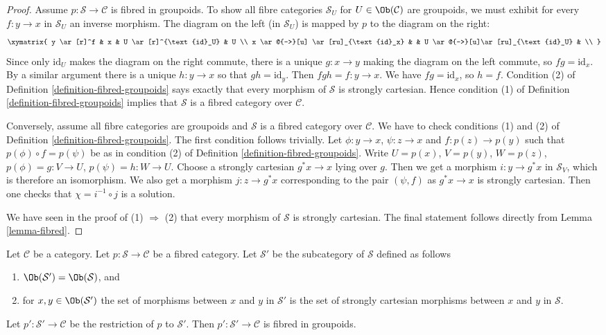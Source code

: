 \begin{proof}
Assume $p : \mathcal{S} \to \mathcal{C}$ is fibred in groupoids.
To show all fibre categories $\mathcal{S}_U$ for
$U \in \Ob(\mathcal{C})$
are groupoids, we must exhibit for every $f : y \to x$ in $\mathcal{S}_U$ an
inverse morphism. The diagram on the left (in $\mathcal{S}_U$) is mapped by
$p$ to the diagram on the right:
$$
\xymatrix{
y \ar[r]^f & x & U \ar[r]^{\text{id}_U} & U \\
x \ar@{-->}[u] \ar[ru]_{\text{id}_x} & &
U \ar@{-->}[u]\ar[ru]_{\text{id}_U} & \\
}
$$
Since only $\text{id}_U$ makes the diagram on the right commute, there is a
unique $g : x \to y$ making the diagram on the left commute, so
$fg = \text{id}_x$. By a similar argument there is a unique $h : y \to x$ so
that $gh = \text{id}_y$. Then $fgh = f : y \to x$. We have $fg = \text{id}_x$,
so $h = f$. Condition (2) of Definition \ref{definition-fibred-groupoids} says
exactly that every morphism of $\mathcal{S}$ is strongly cartesian. Hence
condition (1) of Definition \ref{definition-fibred-groupoids} implies that
$\mathcal{S}$ is a fibred category over $\mathcal{C}$.

\medskip\noindent
Conversely, assume all fibre categories are groupoids and
$\mathcal{S}$ is a fibred category over $\mathcal{C}$.
We have to check conditions (1) and (2) of
Definition \ref{definition-fibred-groupoids}.
The first condition follows trivially. Let $\phi : y \to x$,
$\psi : z \to x$ and $f : p(z) \to p(y)$ such that
$p(\phi) \circ f = p(\psi)$ be as in condition (2) of
Definition \ref{definition-fibred-groupoids}.
Write $U = p(x)$, $V = p(y)$, $W = p(z)$, $p(\phi) = g : V \to U$,
$p(\psi) = h : W \to U$. Choose a strongly cartesian $g^*x \to x$
lying over $g$. Then we get a morphism $i : y \to g^*x$ in
$\mathcal{S}_V$, which is therefore an isomorphism. We
also get a morphism $j : z \to g^*x$ corresponding to
the pair $(\psi, f)$ as $g^*x \to x$ is strongly cartesian.
Then one checks that $\chi = i^{-1} \circ j$ is a solution.

\medskip\noindent
We have seen in the proof of (1) $\Rightarrow$ (2) that
every morphism of $\mathcal{S}$ is strongly cartesian.
The final statement follows directly from Lemma \ref{lemma-fibred}.
\end{proof}

\begin{lemma}
\label{lemma-fibred-gives-fibred-groupoids}
Let $\mathcal{C}$ be a category.
Let $p : \mathcal{S} \to \mathcal{C}$ be a fibred category.
Let $\mathcal{S}'$ be the subcategory of $\mathcal{S}$ defined
as follows
\begin{enumerate}
\item $\Ob(\mathcal{S}') = \Ob(\mathcal{S})$, and
\item for $x, y \in \Ob(\mathcal{S}')$ the set of morphisms between $x$
and $y$ in $\mathcal{S}'$ is the set of strongly cartesian morphisms between
$x$ and $y$ in $\mathcal{S}$.
\end{enumerate}
Let $p' : \mathcal{S}' \to \mathcal{C}$ be the restriction of $p$
to $\mathcal{S}'$. Then $p' : \mathcal{S}' \to \mathcal{C}$ is fibred
in groupoids.
\end{lemma}

